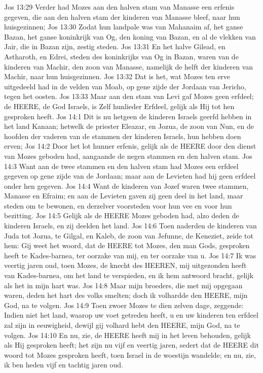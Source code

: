 Jos 13:29  Verder had Mozes aan den halven stam van Manasse een erfenis gegeven, die aan den halven stam der kinderen van Manasse bleef, naar hun huisgezinnen;
Jos 13:30  Zodat hun landpale was van Mahanaim af, het ganse Bazan, het ganse koninkrijk van Og, den koning van Bazan, en al de vlekken van Jair, die in Bazan zijn, zestig steden.
Jos 13:31  En het halve Gilead, en Astharoth, en Edrei, steden des koninkrijks van Og in Bazan, waren van de kinderen van Machir, den zoon van Manasse, namelijk de helft der kinderen van Machir, naar hun huisgezinnen.
Jos 13:32  Dat is het, wat Mozes ten erve uitgedeeld had in de velden van Moab, op gene zijde der Jordaan van Jericho, tegen het oosten.
Jos 13:33  Maar aan den stam van Levi gaf Mozes geen erfdeel; de HEERE, de God Israels, is Zelf hunlieder Erfdeel, gelijk als Hij tot hen gesproken heeft.
Jos 14:1  Dit is nu hetgeen de kinderen Israels geerfd hebben in het land Kanaan; hetwelk de priester Eleazar, en Jozua, de zoon van Nun, en de hoofden der vaderen van de stammen der kinderen Israels, hun hebben doen erven;
Jos 14:2  Door het lot hunner erfenis, gelijk als de HEERE door den dienst van Mozes geboden had, aangaande de negen stammen en den halven stam.
Jos 14:3  Want aan de twee stammen en den halven stam had Mozes een erfdeel gegeven op gene zijde van de Jordaan; maar aan de Levieten had hij geen erfdeel onder hen gegeven.
Jos 14:4  Want de kinderen van Jozef waren twee stammen, Manasse en Efraim; en aan de Levieten gaven zij geen deel in het land, maar steden om te bewonen, en derzelver voorsteden voor hun vee en voor hun bezitting.
Jos 14:5  Gelijk als de HEERE Mozes geboden had, alzo deden de kinderen Israels, en zij deelden het land.
Jos 14:6  Toen naderden de kinderen van Juda tot Jozua, te Gilgal, en Kaleb, de zoon van Jefunne, de Keneziet, zeide tot hem: Gij weet het woord, dat de HEERE tot Mozes, den man Gods, gesproken heeft te Kades-barnea, ter oorzake van mij, en ter oorzake van u.
Jos 14:7  Ik was veertig jaren oud, toen Mozes, de knecht des HEEREN, mij uitgezonden heeft van Kades-barnea, om het land te verspieden, en ik hem antwoord bracht, gelijk als het in mijn hart was.
Jos 14:8  Maar mijn broeders, die met mij opgegaan waren, deden het hart des volks smelten; doch ik volhardde den HEERE, mijn God, na te volgen.
Jos 14:9  Toen zwoer Mozes te dien zelven dage, zeggende: Indien niet het land, waarop uw voet getreden heeft, u en uw kinderen ten erfdeel zal zijn in eeuwigheid, dewijl gij volhard hebt den HEERE, mijn God, na te volgen.
Jos 14:10  En nu, zie, de HEERE heeft mij in het leven behouden, gelijk als Hij gesproken heeft; het zijn nu vijf en veertig jaren, sedert dat de HEERE dit woord tot Mozes gesproken heeft, toen Israel in de woestijn wandelde; en nu, zie, ik ben heden vijf en tachtig jaren oud.
